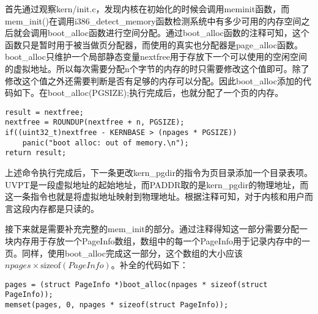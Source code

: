 \label{sec:virtual_memory}
\begin{exerciseSolution}{1}
    \par 首先通过观察kern/init.c，发现内核在初始化的时候会调用meminit函数，而mem\_init()在调用i386\_detect\_memory函数检测系统中有多少可用的内存空间之后就会调用boot\_alloc函数进行空间分配。通过boot\_alloc函数的注释可知，这个函数只是暂时用于被当做页分配器，而使用的真实也分配器是page\_alloc函数。boot\_alloc只维护一个局部静态变量nextfree用于存放下一个可以使用的空闲空间的虚拟地址。所以每次需要分配n个字节的内存的时只需要修改这个值即可。除了修改这个值之外还需要判断是否有足够的内存可以分配。因此boot\_alloc添加的代码如下。在boot\_alloc(PGSIZE);执行完成后，也就分配了一个页的内存。
    \begin{lstlisting}
result = nextfree;
nextfree = ROUNDUP(nextfree + n, PGSIZE);
if((uint32_t)nextfree - KERNBASE > (npages * PGSIZE))
    panic("boot alloc: out of memory.\n");
return result;
    \end{lstlisting}

    \par 上述命令执行完成后，下一条更改kern\_pgdir的指令为页目录添加一个目录表项。UVPT是一段虚拟地址的起始地址，而PADDR取的是kern\_pgdir的物理地址，而这一条指令也就是将虚拟地址映射到物理地址。根据注释可知，对于内核和用户而言这段内存都是只读的。
    \par 接下来就是需要补充完整的mem\_init的部分。通过注释得知这一部分需要分配一块内存用于存放一个PageInfo数组，数组中的每一个PageInfo用于记录内存中的一页。同样，使用boot\_alloc完成这一部分，这个数组的大小应该$npages\times \text{sizeof}(PageInfo)$。补全的代码如下：
    \begin{lstlisting}
pages = (struct PageInfo *)boot_alloc(npages * sizeof(struct PageInfo));
memset(pages, 0, npages * sizeof(struct PageInfo));
    \end{lstlisting}


\end{exerciseSolution}
